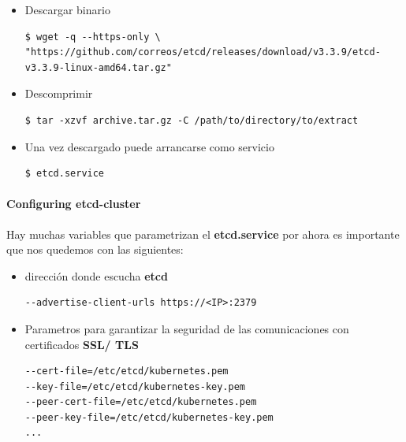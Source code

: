 \documentclass{article}
\newenvironment{codetemplate}[1][]{%
  \mybasecolorbox[#1]
  \itshape
}{%
  \endmybasecolorbox
}
\begin{document}
\begin{itemize}
    \item Descargar binario
\begin{codetemplate}{}
\begin{verbatim}
$ wget -q --https-only \ 
"https://github.com/correos/etcd/releases/download/v3.3.9/etcd-v3.3.9-linux-amd64.tar.gz"
\end{verbatim}
\end{codetemplate}

    \item Descomprimir
\begin{codetemplate}{}
\begin{verbatim}
$ tar -xzvf archive.tar.gz -C /path/to/directory/to/extract
\end{verbatim}
\end{codetemplate} 

    \item Una vez descargado puede arrancarse como servicio
\begin{codetemplate}{}
\begin{verbatim}
$ etcd.service
\end{verbatim}
\end{codetemplate}
\end{itemize}

\paragraph{Configuring etcd-cluster}

Hay muchas variables que parametrizan el \textbf{etcd.service} por ahora es importante que nos quedemos con las siguientes: 

\begin{itemize}
    \item dirección donde escucha \textbf{etcd}
\begin{codetemplate}{}
\begin{verbatim}
--advertise-client-urls https://<IP>:2379
\end{verbatim}
\end{codetemplate}

    \item Parametros para garantizar la seguridad de las comunicaciones con certificados \textbf{SSL/ TLS}
\begin{codetemplate}{}
\begin{verbatim}
--cert-file=/etc/etcd/kubernetes.pem
--key-file=/etc/etcd/kubernetes-key.pem
--peer-cert-file=/etc/etcd/kubernetes.pem
--peer-key-file=/etc/etcd/kubernetes-key.pem
...
\end{verbatim}
\end{codetemplate}


\end{itemize}
\end{document}
